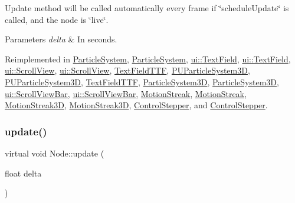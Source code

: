 Update method will be called automatically every frame if \char`\"{}schedule\+Update\char`\"{} is called, and the node is \char`\"{}live\char`\"{}. 
\begin{DoxyParams}{Parameters}
{\em delta} & In seconds. \\
\hline
\end{DoxyParams}


Reimplemented in \hyperlink{classParticleSystem_ac2b03d34a27150678a2737453ad1b7e3}{Particle\+System}, \hyperlink{classParticleSystem_a11a1c88736ddcd626ba8039b4268e82e}{Particle\+System}, \hyperlink{classui_1_1TextField_a7684f9503909dfc66085922bd52ec449}{ui\+::\+Text\+Field}, \hyperlink{classui_1_1TextField_a9caf0239e6855d3f608946b432b9ad59}{ui\+::\+Text\+Field}, \hyperlink{classui_1_1ScrollView_a4daad841add32c92b12e8c4c909b2b2e}{ui\+::\+Scroll\+View}, \hyperlink{classui_1_1ScrollView_a15b50cbbccdeff8dd34e8d0ab6ea82f7}{ui\+::\+Scroll\+View}, \hyperlink{classTextFieldTTF_a81ad55bca952a4927d3c4acfe8385030}{Text\+Field\+T\+TF}, \hyperlink{classPUParticleSystem3D_a42ba23b8909057126e8a9606f9cd4e8c}{P\+U\+Particle\+System3D}, \hyperlink{classPUParticleSystem3D_a9fdfe542cd05fcf270644dff49f81857}{P\+U\+Particle\+System3D}, \hyperlink{classTextFieldTTF_a004230b3dc3f90069b3094152e7c8eb0}{Text\+Field\+T\+TF}, \hyperlink{classParticleSystem3D_a446b0819b60fb46ce308e3d17e7625b0}{Particle\+System3D}, \hyperlink{classParticleSystem3D_a04fb4f09a517f393b5deb8174b964e40}{Particle\+System3D}, \hyperlink{classui_1_1ScrollViewBar_a9584b184a09bc1bf24f1a8805641294b}{ui\+::\+Scroll\+View\+Bar}, \hyperlink{classui_1_1ScrollViewBar_a26112897dfbfd6d3d727337f65177f1f}{ui\+::\+Scroll\+View\+Bar}, \hyperlink{classMotionStreak_a03d1e1113084f8e91b537539e7c19b9c}{Motion\+Streak}, \hyperlink{classMotionStreak_a915b84eec6e1e4576d9aa0c1e6528fe7}{Motion\+Streak}, \hyperlink{classMotionStreak3D_a3d336bcb41bd598ba73389378b278382}{Motion\+Streak3D}, \hyperlink{classMotionStreak3D_a195dbdebb5c5d55d3d09c4e5dc716a91}{Motion\+Streak3D}, \hyperlink{classControlStepper_a29a2d69a159c790691365db8a9f87d33}{Control\+Stepper}, and \hyperlink{classControlStepper_a29a2d69a159c790691365db8a9f87d33}{Control\+Stepper}.

\mbox{\label{classNode_ac907777c1012f808043412c76cf9e183}} 
\subsubsection{\texorpdfstring{update()}{update()}\hspace{0.1cm}{\footnotesize\ttfamily [2/2]}}
{\footnotesize\ttfamily virtual void Node\+::update (\begin{DoxyParamCaption}\item[{float}]{delta }\end{DoxyParamCaption})\hspace{0.3cm}{\ttfamily [virtual]}}

